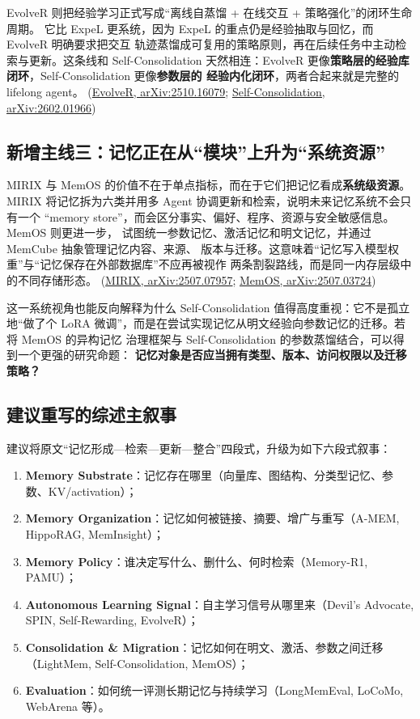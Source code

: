 \documentclass[11pt,a4paper]{article}
\begin{document}
EvolveR 则把经验学习正式写成“离线自蒸馏 + 在线交互 + 策略强化”的闭环生命周期。
它比 ExpeL 更系统，因为 ExpeL 的重点仍是经验抽取与回忆，而 EvolveR 明确要求把交互
轨迹蒸馏成可复用的策略原则，再在后续任务中主动检索与更新。这条线和 Self-Consolidation
天然相连：EvolveR 更像\textbf{策略层的经验库闭环}，Self-Consolidation 更像\textbf{参数层的
经验内化闭环}，两者合起来就是完整的 lifelong agent。
\hfill(\href{https://arxiv.org/abs/2510.16079}{EvolveR, arXiv:2510.16079};
\href{https://arxiv.org/abs/2602.01966}{Self-Consolidation, arXiv:2602.01966})

\subsection{新增主线三：记忆正在从“模块”上升为“系统资源”}

MIRIX 与 MemOS 的价值不在于单点指标，而在于它们把记忆看成\textbf{系统级资源}。
MIRIX 将记忆拆为六类并用多 Agent 协调更新和检索，说明未来记忆系统不会只有一个
“memory store”，而会区分事实、偏好、程序、资源与安全敏感信息。MemOS 则更进一步，
试图统一参数记忆、激活记忆和明文记忆，并通过 MemCube 抽象管理记忆内容、来源、
版本与迁移。这意味着“记忆写入模型权重”与“记忆保存在外部数据库”不应再被视作
两条割裂路线，而是同一内存层级中的不同存储形态。
\hfill(\href{https://arxiv.org/abs/2507.07957}{MIRIX, arXiv:2507.07957};
\href{https://arxiv.org/abs/2507.03724}{MemOS, arXiv:2507.03724})

这一系统视角也能反向解释为什么 Self-Consolidation 值得高度重视：它不是孤立地“做了个
LoRA 微调”，而是在尝试实现记忆从明文经验向参数记忆的迁移。若将 MemOS 的异构记忆
治理框架与 Self-Consolidation 的参数蒸馏结合，可以得到一个更强的研究命题：
\textbf{记忆对象是否应当拥有类型、版本、访问权限以及迁移策略？}

\subsection{建议重写的综述主叙事}

建议将原文“记忆形成—检索—更新—整合”四段式，升级为如下六段式叙事：

\begin{enumerate}
  \item \textbf{Memory Substrate}：记忆存在哪里（向量库、图结构、分类型记忆、参数、KV/activation）；
  \item \textbf{Memory Organization}：记忆如何被链接、摘要、增广与重写（A-MEM, HippoRAG, MemInsight）；
  \item \textbf{Memory Policy}：谁决定写什么、删什么、何时检索（Memory-R1, PAMU）；
  \item \textbf{Autonomous Learning Signal}：自主学习信号从哪里来（Devil's Advocate, SPIN, Self-Rewarding, EvolveR）；
  \item \textbf{Consolidation \& Migration}：记忆如何在明文、激活、参数之间迁移（LightMem, Self-Consolidation, MemOS）；
  \item \textbf{Evaluation}：如何统一评测长期记忆与持续学习（LongMemEval, LoCoMo, WebArena 等）。
\end{enumerate}
\end{document}
